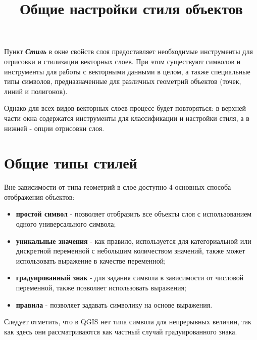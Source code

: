 \documentclass[
  russian,
  letterpaper,
  DIV=11,
  numbers=noendperiod]{scrartcl}
\title{Общие настройки стиля объектов}
\author{}
\date{}
\begin{document}
\maketitle


Пункт \textbf{\emph{Стиль}} в окне свойств слоя предоставляет
необходимые инструменты для отрисовки и стилизации векторных слоев. При
этом существуют символов и инструменты для работы с векторными данными в
целом, а также специальные типы символов, предназначенные для различных
геометрий объектов (точек, линий и полигонов).

Однако для всех видов векторных слоев процесс будет повторяться: в
верхней части окна содержатся инструменты для классификации и настройки
стиля, а в нижней - опции отрисовки слоя.

\section{Общие типы
стилей}\label{ux43eux431ux449ux438ux435-ux442ux438ux43fux44b-ux441ux442ux438ux43bux435ux439}

Вне зависимости от типа геометрий в слое доступно 4 основных способа
отображения объектов:

\begin{itemize}
\item
  \textbf{простой символ} - позволяет отобразить все объекты слоя с
  использованием одного универсального символа;
\item
  \textbf{уникальные значения} - как правило, используется для
  категориальной или дискретной переменной с небольшим количеством
  значений, также может использовать выражение в качестве переменной;
\item
  \textbf{градуированный знак} - для задания символа в зависимости от
  числовой переменной, также позволяет использовать выражения;
\item
  \textbf{правила} - позволяет задавать символику на основе выражения.
\end{itemize}

\begin{tcolorbox}[enhanced jigsaw, arc=.35mm, bottomrule=.15mm, bottomtitle=1mm, breakable, colback=white, colbacktitle=quarto-callout-note-color!10!white, colframe=quarto-callout-note-color-frame, coltitle=black, left=2mm, leftrule=.75mm, opacityback=0, opacitybacktitle=0.6, rightrule=.15mm, title=\textcolor{quarto-callout-note-color}{\faInfo}\hspace{0.5em}{На заметку}, titlerule=0mm, toprule=.15mm, toptitle=1mm]

Следует отметить, что в QGIS нет типа символа для непрерывных величин,
так как здесь они рассматриваются как частный случай градуированного
знака.

\end{tcolorbox}
\end{document}
